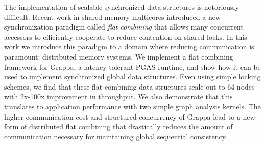 The implementation of scalable synchronized data structures is notoriously difficult. Recent work in shared-memory multicores introduced a new synchronization paradigm called \emph{flat combining} that allows many concurrent accessors to efficiently cooperate to reduce contention on shared locks.
In this work we introduce this paradigm to a domain where reducing communication is paramount: distributed memory systems.
We implement a flat combining framework for Grappa, a latency-tolerant PGAS runtime, and show how it can be used to implement synchronized global data structures.
Even using simple locking schemes, we find that these flat-combining data structures scale out to 64 nodes with 2x-100x improvement in throughput. We also demonstrate that this translates to application performance with two simple graph analysis kernels.
The higher communication cost and structured concurrency of Grappa lead to a new form of distributed flat combining that drastically reduces the amount of communication necessary for maintaining global sequential consistency.
